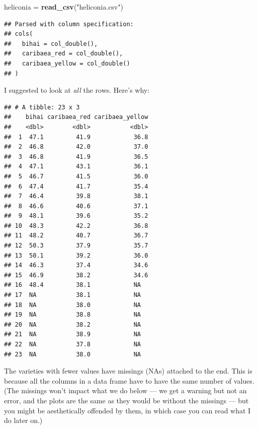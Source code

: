 \documentclass[]{tufte-book}
\newenvironment{Shaded}{}{}
\newcommand{\DataTypeTok}[1]{\textcolor[rgb]{0.56,0.13,0.00}{#1}}
\newcommand{\KeywordTok}[1]{\textcolor[rgb]{0.00,0.44,0.13}{\textbf{#1}}}
\newcommand{\NormalTok}[1]{#1}
\newcommand{\OperatorTok}[1]{\textcolor[rgb]{0.40,0.40,0.40}{#1}}
\newcommand{\OtherTok}[1]{\textcolor[rgb]{0.00,0.44,0.13}{#1}}
\newcommand{\StringTok}[1]{\textcolor[rgb]{0.25,0.44,0.63}{#1}}
\theoremstyle{definition}
\theoremstyle{definition}
\theoremstyle{definition}
\theoremstyle{remark}
\begin{document}
\begin{Shaded}
\begin{Highlighting}[]
\NormalTok{heliconia =}\StringTok{ }\KeywordTok{read_csv}\NormalTok{(}\StringTok{"heliconia.csv"}\NormalTok{)}
\end{Highlighting}
\end{Shaded}

\begin{verbatim}
## Parsed with column specification:
## cols(
##   bihai = col_double(),
##   caribaea_red = col_double(),
##   caribaea_yellow = col_double()
## )
\end{verbatim}

I suggested to look at \emph{all} the rows. Here's why:

\begin{Shaded}
\end{Shaded}

\begin{verbatim}
## # A tibble: 23 x 3
##    bihai caribaea_red caribaea_yellow
##    <dbl>        <dbl>           <dbl>
##  1  47.1         41.9            36.8
##  2  46.8         42.0            37.0
##  3  46.8         41.9            36.5
##  4  47.1         43.1            36.1
##  5  46.7         41.5            36.0
##  6  47.4         41.7            35.4
##  7  46.4         39.8            38.1
##  8  46.6         40.6            37.1
##  9  48.1         39.6            35.2
## 10  48.3         42.2            36.8
## 11  48.2         40.7            36.7
## 12  50.3         37.9            35.7
## 13  50.1         39.2            36.0
## 14  46.3         37.4            34.6
## 15  46.9         38.2            34.6
## 16  48.4         38.1            NA  
## 17  NA           38.1            NA  
## 18  NA           38.0            NA  
## 19  NA           38.8            NA  
## 20  NA           38.2            NA  
## 21  NA           38.9            NA  
## 22  NA           37.8            NA  
## 23  NA           38.0            NA
\end{verbatim}

The varieties with fewer values have missings (NAs) attached to the end.
This is because all the columns in a data frame have to have the same
number of values. (The missings won't impact what we do below --- we get
a warning but not an error, and the plots are the same as they would be
without the missings --- but you might be aesthetically offended by
them, in which case you can read what I do later on.)
\end{document}
